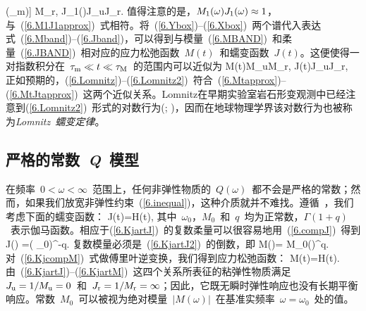 \ln(\omega\tau_{\rm m})\right]
\approx M_{\rm r},
\en
\eq \label{6.DISPERJ}
J_1(\omega)\approx J_{\rm u}
\approx J_{\rm r}.
\en
值得注意的是，$M_1(\mbox{$\omega$})J_1(\mbox{$\omega$})\approx 1$，与~(\ref{6.M1J1approx})~式相符。将~(\ref{6.Ybox})--(\ref{6.Xbox})~两个谱代入表达式~(\ref{6.Mband})--(\ref{6.Jband})，可以得到与模量~(\ref{6.MBAND})~和柔量~(\ref{6.JBAND})~相对应的应力松弛函数~$M(t)$~和蠕变函数~$J(t)$。这便使得一对指数积分在~$\tau_{\rm m}\ll t\ll\tau_{\rm M}$~的范围内可以近似为
\eq \label{6.Lomnitz}
M(t)\approx M_{\rm u}
\approx M_{\rm r},
\en
\eq \label{6.Lomnitz2}
J(t)\approx J_{\rm u}
\approx J_{\rm r},
\en
正如预期的，(\ref{6.Lomnitz})--(\ref{6.Lomnitz2})~符合~(\ref{6.Mtapprox})--(\ref{6.MtJtapprox})~这两个近似关系。Lomnitz在早期实验室岩石形变观测中已经注意到(\ref{6.Lomnitz2})~形式的对数行为(\citeyear{lomnitz56}; \citeyear{lomnitz57})，因而在地球物理学界该对数行为也被称为{\em Lomnitz~蠕变定律\/}。
%
%


\renewcommand{\thesubsection}{$\!\!\!\raise1.3ex\hbox{$\star$}\!\!$
\arabic{chapter}.\arabic{section}.\arabic{subsection}}
\subsection{严格的常数~\textbf{\textit{Q}}~模型}
%
%
%
\label{6.sec.Kjart}
\renewcommand{\thesubsection}{\arabic{chapter}.\arabic{section}.\arabic{subsection}}

在频率~$0<\omega<\infty$~范围上，任何非弹性物质的~$Q(\omega)$~都不会是严格的常数；然而，如果我们放宽非弹性约束~(\ref{6.inequal})，这种介质就并不难找。遵循~\textcite{kjartansson79}，我们考虑下面的蠕变函数：
\eq
\label{6.KjartJ}
J(t)=H(t),
\en
其中~$\omega_0$，$M_0$~和~$q$~均为正常数，$\Gamma(1+q)$~表示伽马函数。相应于(\ref{6.KjartJ})~的复数柔量可以很容易地用~(\ref{6.compJ})~得到
\eq
\label{6.KjartJ2}
J(\nu)
=\left(
{\omega_0}\right)^{\!-q}.
\en
复数模量必须是~(\ref{6.KjartJ2})~的倒数，即
\eq
\label{6.KjcompM}
M(\nu)=
M_0\left(\right)^q.
\en
对~(\ref{6.KjcompM})~式做傅里叶逆变换，我们得到应力松弛函数：
\eq
\label{6.KjartM}
M(t)=H(t).
\en
由~(\ref{6.KjartJ})--(\ref{6.KjartM})~这四个关系所表征的粘弹性物质满足~$J_{\rm u}=1/M_{\rm u}=0$~和~$J_{\rm r}=1/M_{\rm r}=\infty$；因此，它既无瞬时弹性响应也没有长期平衡响应。常数~$M_0$~可以被视为绝对模量~$|M(\omega)|$~在基准实频率~$\omega=\omega_0$~处的值。


